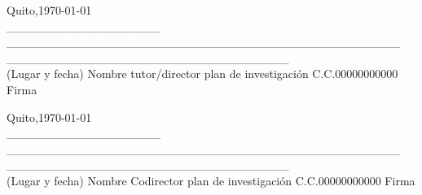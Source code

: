 \documentclass[a4paper,12pt]{article}
\begin{document}
\vspace{1cm}

\begin{flushleft}
	Quito,\today\\
	\_\_\_\_\_\_\_\_\_\_\_\_\_\_\_\_\_\_\hspace{0.1cm} \_\_\_\_\_\_\_\_\_\_\_\_\_\_\_\_\_\_\_\_\_\_\_\_\_\_\_\_\_\_\_\_\_\_\_\_\_\_\_\_\_\_\_\_\_\_  \hspace{0.3cm}\_\_\_\_\_\_\_\_\_\_\_\_\_\_\_\_\_\hspace{0.1cm}\_\_\_\_\_\_\_\_\_\_\_\_\_\_\_\_\\
	(Lugar y fecha) \hspace{0.0cm} Nombre tutor/director plan de investigación \hspace{0.1cm} C.C.\hspace{0.05cm}00000000000 \hspace{0.1cm} Firma \\
\end{flushleft}

\vspace{1cm}

\begin{flushleft}
	Quito,\today\\
	\_\_\_\_\_\_\_\_\_\_\_\_\_\_\_\_\_\_\hspace{0.1cm} \_\_\_\_\_\_\_\_\_\_\_\_\_\_\_\_\_\_\_\_\_\_\_\_\_\_\_\_\_\_\_\_\_\_\_\_\_\_\_\_\_\_\_\_\_\_  \hspace{0.3cm}\_\_\_\_\_\_\_\_\_\_\_\_\_\_\_\_\_\hspace{0.1cm}\_\_\_\_\_\_\_\_\_\_\_\_\_\_\_\_\\
	(Lugar y fecha) \hspace{0.0cm} Nombre Codirector plan de investigación \hspace{0.1cm} C.C.\hspace{0.05cm}00000000000 \hspace{0.1cm} Firma \\
\end{flushleft}

\vspace{1cm}
\end{document}
